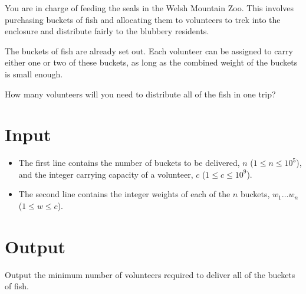 
You are in charge of feeding the seals in the Welsh Mountain Zoo. This involves
purchasing buckets of fish and allocating them to volunteers to trek into the
enclosure and distribute fairly to the blubbery residents.

The buckets of fish are already set out. Each volunteer can be assigned to
carry either one or two of these buckets, as long as the combined weight of the
buckets is small enough.

How many volunteers will you need to distribute all of the fish in one trip?

\section*{Input}

\begin{itemize}
  \item The first line contains the number of buckets to be delivered, $n$
        ($1 \le n \le 10^5$), and the integer carrying capacity of a
        volunteer, $c$ ($1 \le c \le 10^9$).
  \item The second line contains the integer weights of each of the $n$
        buckets, $w_1 \ldots w_n$ ($1 \le w \le c$).
\end{itemize}

\section*{Output}

Output the minimum number of volunteers required to deliver all of the buckets
of fish.

